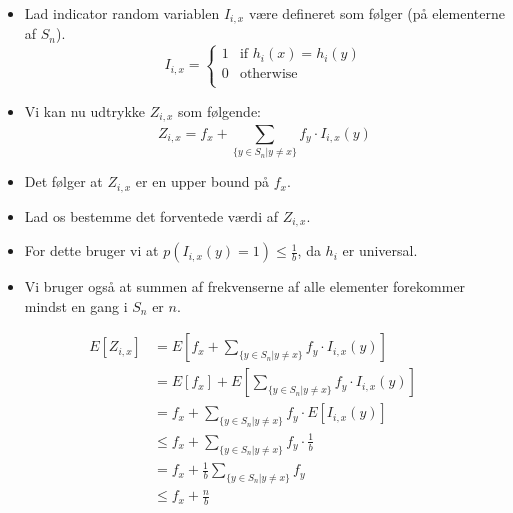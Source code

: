 \documentclass{beamer}
\begin{document}
\begin{frame}[allowframebreaks]
\begin{itemize}
   \item Lad indicator random variablen $I_{i,x}$ være defineret som følger (på elementerne af $S_{n}$).
     \[ I_{i,x} = \begin{cases}
       1 & \text{if }h_{i}(x) = h_{i}(y) \\
       0 & \text{otherwise}\\
     \end{cases} \]
 \item Vi kan nu udtrykke $Z_{i,x}$ som følgende:
   \[ Z_{i,x} =f_{x} + \sum_{\{y \in S_{n} | y \neq x\}}^{}f_{y} \cdot I_{i,x}(y) \]
   \item Det følger at $Z_{i,x}$ er en upper bound på $f_{x}$. 
   \item Lad os bestemme det forventede værdi af $Z_{i,x}$. 
   \item For dette bruger vi at $p(I_{i,x}(y) = 1) \leq \frac{1}{b}$, da $h_{i}$ er universal.
   \item Vi bruger også at summen af frekvenserne af alle elementer forekommer mindst en gang i $S_n$ er $n$.
 \end{itemize} 
\begin{align*}
E[Z_{i,x}] &= E[f_x + \sum_{\{y \in S_n | y \neq x\}} f_y \cdot I_{i,x}(y)] \\
           &= E[f_x] + E[\sum_{\{y \in S_n | y \neq x\}} f_y \cdot I_{i,x}(y)] \\
           &= f_x + \sum_{\{y \in S_n | y \neq x\}} f_y \cdot E[I_{i,x}(y)] \\
           &\leq f_x + \sum_{\{y \in S_n | y \neq x\}} f_y \cdot \frac{1}{b} \\
           &= f_x + \frac{1}{b} \sum_{\{y \in S_n | y \neq x\}} f_y \\
           &\leq f_x + \frac{n}{b}
\end{align*}


\end{frame}
\end{document}
